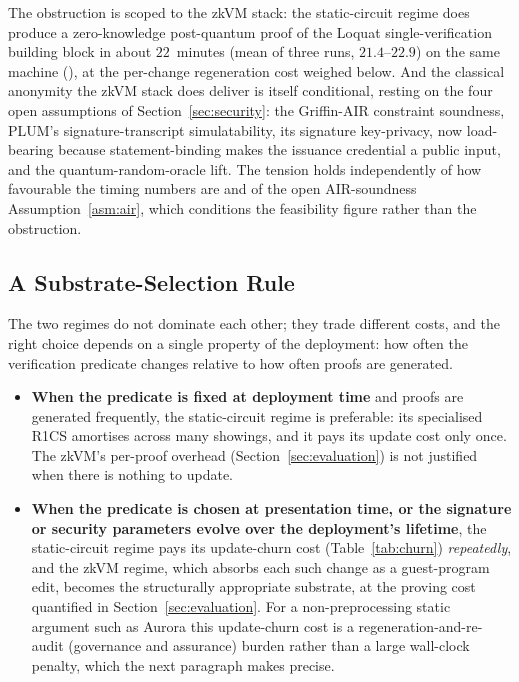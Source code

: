 The obstruction is scoped to the zkVM stack: the static-circuit regime does produce a zero-knowledge post-quantum proof of the Loquat single-verification building block in about $22$~minutes (mean of three runs, $21.4$--$22.9$) on the same machine (), at the per-change regeneration cost weighed below. And the classical anonymity the zkVM stack does deliver is itself conditional, resting on the four open assumptions of Section~\ref{sec:security}: the Griffin-AIR constraint soundness, PLUM's signature-transcript simulatability, its signature key-privacy, now load-bearing because statement-binding makes the issuance credential a public input, and the quantum-random-oracle lift. The tension holds independently of how favourable the timing numbers are and of the open AIR-soundness Assumption~\ref{asm:air}, which conditions the feasibility figure rather than the obstruction.

\subsection{A Substrate-Selection Rule}\label{ssec:decision}
The two regimes do not dominate each other; they trade different costs, and the right choice depends on a single property of the deployment: how often the verification predicate changes relative to how often proofs are generated.

\begin{itemize}
  \item \textbf{When the predicate is fixed at deployment time} and proofs are generated frequently, the static-circuit regime is preferable: its specialised R1CS amortises across many showings, and it pays its update cost only once. The zkVM's per-proof overhead (Section~\ref{sec:evaluation}) is not justified when there is nothing to update.
  \item \textbf{When the predicate is chosen at presentation time, or the signature or security parameters evolve over the deployment's lifetime}, the static-circuit regime pays its update-churn cost (Table~\ref{tab:churn}) \emph{repeatedly}, and the zkVM regime, which absorbs each such change as a guest-program edit, becomes the structurally appropriate substrate, at the proving cost quantified in Section~\ref{sec:evaluation}. For a non-preprocessing static argument such as Aurora this update-churn cost is a regeneration-and-re-audit (governance and assurance) burden rather than a large wall-clock penalty, which the next paragraph makes precise.
\end{itemize}

